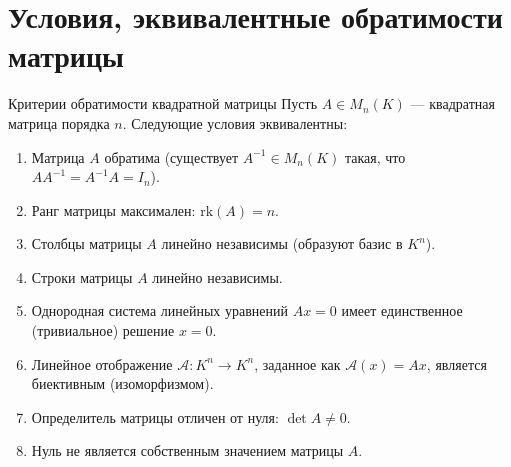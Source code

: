 
\section{Условия, эквивалентные обратимости матрицы}


\begin{Theorem}{Критерии обратимости квадратной матрицы}{}
	Пусть $A \in M_n(K)$ --- квадратная матрица порядка $n$. Следующие условия эквивалентны:
	\begin{enumerate}
		\item Матрица $A$ обратима (существует $A^{-1} \in M_n(K)$ такая, что $A A^{-1} = A^{-1} A = I_n$).
		\item Ранг матрицы максимален: $\mathrm{rk}(A) = n$.
		\item Столбцы матрицы $A$ линейно независимы (образуют базис в $K^n$).
		\item Строки матрицы $A$ линейно независимы.
		\item Однородная система линейных уравнений $Ax = 0$ имеет единственное (тривиальное) решение $x = 0$.
		\item Линейное отображение $\mathcal{A} \colon K^n \to K^n$, заданное как $\mathcal{A}(x) = Ax$, является биективным (изоморфизмом).
		\item Определитель матрицы отличен от нуля: $\det A \neq 0$.
		\item Нуль не является собственным значением матрицы $A$.
	\end{enumerate}
\end{Theorem}

